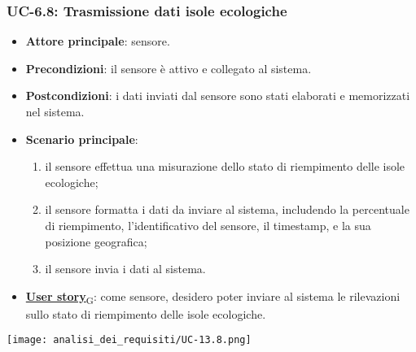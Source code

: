 \subsubsection{UC-6.8: Trasmissione dati isole ecologiche}
\begin{itemize}
	\item \textbf{Attore principale}: sensore.
	\item \textbf{Precondizioni}: il sensore è attivo e collegato al sistema.
	\item \textbf{Postcondizioni}: i dati inviati dal sensore sono stati elaborati e memorizzati nel sistema.
	\item \textbf{Scenario principale}:
	      \begin{enumerate}
		      \item il sensore effettua una misurazione dello stato di riempimento delle isole ecologiche;
		      \item il sensore formatta i dati da inviare al sistema, includendo la percentuale di riempimento, l'identificativo del sensore,
		            il timestamp, e la sua posizione geografica;
		      \item il sensore invia i dati al sistema.
	      \end{enumerate}
	\item \href{https://7last.github.io/docs/rtb/documentazione-interna/glossario\#user-story}{\textbf{User story}\textsubscript{G}}: come sensore, desidero poter inviare al sistema le rilevazioni sullo stato di riempimento delle isole ecologiche.
\end{itemize}

\begin{center}
	\texttt{[image: analisi\_dei\_requisiti/UC-13.8.png]}
\end{center}

